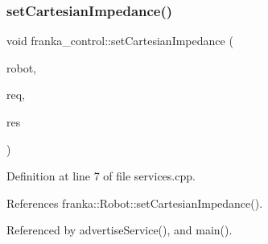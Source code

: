 \subsubsection{\texorpdfstring{set\+Cartesian\+Impedance()}{setCartesianImpedance()}}
{\footnotesize\ttfamily void franka\+\_\+control\+::set\+Cartesian\+Impedance (\begin{DoxyParamCaption}\item[{\hyperlink{classfranka_1_1Robot}{franka\+::\+Robot} \&}]{robot,  }\item[{const Set\+Cartesian\+Impedance\+::\+Request \&}]{req,  }\item[{Set\+Cartesian\+Impedance\+::\+Response \&}]{res }\end{DoxyParamCaption})}



Definition at line 7 of file services.\+cpp.



References franka\+::\+Robot\+::set\+Cartesian\+Impedance().



Referenced by advertise\+Service(), and main().


